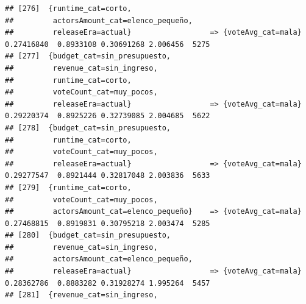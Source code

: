 \documentclass[
]{article}
\begin{document}
\begin{verbatim}
## [276]  {runtime_cat=corto,                                                                                                      
##         actorsAmount_cat=elenco_pequeño,                                                                                        
##         releaseEra=actual}                  => {voteAvg_cat=mala}                0.27416840  0.8933108 0.30691268 2.006456  5275
## [277]  {budget_cat=sin_presupuesto,                                                                                             
##         revenue_cat=sin_ingreso,                                                                                                
##         runtime_cat=corto,                                                                                                      
##         voteCount_cat=muy_pocos,                                                                                                
##         releaseEra=actual}                  => {voteAvg_cat=mala}                0.29220374  0.8925226 0.32739085 2.004685  5622
## [278]  {budget_cat=sin_presupuesto,                                                                                             
##         runtime_cat=corto,                                                                                                      
##         voteCount_cat=muy_pocos,                                                                                                
##         releaseEra=actual}                  => {voteAvg_cat=mala}                0.29277547  0.8921444 0.32817048 2.003836  5633
## [279]  {runtime_cat=corto,                                                                                                      
##         voteCount_cat=muy_pocos,                                                                                                
##         actorsAmount_cat=elenco_pequeño}    => {voteAvg_cat=mala}                0.27468815  0.8919831 0.30795218 2.003474  5285
## [280]  {budget_cat=sin_presupuesto,                                                                                             
##         revenue_cat=sin_ingreso,                                                                                                
##         actorsAmount_cat=elenco_pequeño,                                                                                        
##         releaseEra=actual}                  => {voteAvg_cat=mala}                0.28362786  0.8883282 0.31928274 1.995264  5457
## [281]  {revenue_cat=sin_ingreso,                                                                                                

\end{verbatim}
\end{document}
